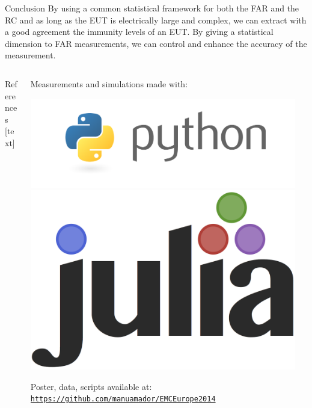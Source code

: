 \documentclass[final,hyperref={pdfpagelabels=false}]{beamer}
\begin{document}
\begin{frame}{}
\begin{block}{\Huge{Conclusion}} \justifying
\Large{By using a common statistical framework for both the FAR and the RC and as long as the EUT is electrically large and complex, we can extract with a good agreement the immunity levels of an EUT. By giving a statistical dimension to FAR measurements, we can control and enhance the accuracy of the measurement.}
	\end{block}%


\begin{columns}[t]

 \begin{column}{0.71\linewidth}
\vspace{-0.8cm}   
\begin{block}{References} \justifying
{}[text]

 \small

	\end{block}

    \end{column}%

    \begin{column}{0.2\linewidth}
    \vspace{0.9cm}
 \hspace{-0.3cm}Measurements and simulations made with:\\
\centerline{\includegraphics[trim=150 120 120 60,clip,width=.4\columnwidth]{./img/python_logo.png}
\hspace{1cm} \includegraphics[width=.2\columnwidth]{./img/julia.png}}
\vspace{0.42cm}
Poster, data, scripts available at:\\\href{https://github.com/manuamador/EMCEurope2014}{\small{\texttt{https://github.com/manuamador/EMCEurope2014}}}
\end{column}%
\begin{column}{0.07\linewidth}


\end{column}
\end{columns}
\end{frame}
\end{document}
